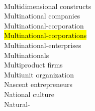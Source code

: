 \documentclass[a4paper]{article}
\begin{document}
\begin{multicols*}{2}
\begin{footnotesize}
\\ Multidimensional constructs \\ Multinational companies \\ Multinational-corporation \\ \hl{Multinational-corporations} \\ Multinational-enterprises \\ Multinationals \\ Multiproduct firms \\ Multiunit organization \\ Nascent entrepreneurs \\ National culture \\ Natural-
\end{footnotesize}
\end{multicols*}
\end{document}

